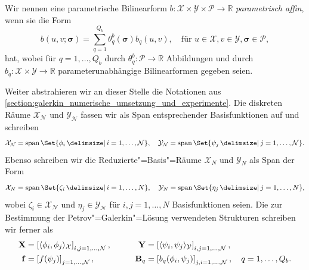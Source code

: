 \documentclass[../main.tex]{subfiles}
\begin{document}
\begin{Definition}
\label{definition:parametrisch_affine_bf_fuer_rbm}
    Wir nennen eine parametrische Bilinearform $b \colon \mathcal X \times \mathcal Y \times \mathcal P \to \mathbb{R}$ \emph{parametrisch affin}, wenn sie die Form
    \begin{equation}
        b(u, v; \bm \sigma) = \sum_{q = 1}^{Q_{b}} \theta_{q}^{b}(\bm \sigma) b_{q}(u, v), \quad \text{für } u \in \mathcal X, v \in \mathcal Y, \bm \sigma \in \mathcal P,
    \end{equation}
    hat, wobei für $q = 1, \dots, Q_{b}$ durch $\theta_{q}^{b} \colon \mathcal P \to \mathbb{R}$ Abbildungen und durch $b_{q} \colon \mathcal X \times \mathcal Y \to \mathbb{R}$ parameterunabhängige Bilinearformen gegeben seien.
\end{Definition}

Weiter abstrahieren wir an dieser Stelle die Notationen aus \cref{section:galerkin_numerische_umsetzung_und_experimente}.
Die diskreten Räume $\mathcal X_{\mathcal N}$ und $\mathcal Y_{\mathcal N}$ fassen wir als Span entsprechender Basisfunktionen auf und schreiben
\begin{equation}
    \mathcal X_{\mathcal N} = \spn \Set{ \phi_{i} \given i = 1, \dots, \mathcal N },
    \quad
    \mathcal Y_{\mathcal N} = \spn \Set{ \psi_{j} \given j = 1, \dots, \mathcal N }.
\end{equation}
Ebenso schreiben wir die Reduzierte"=Basis"=Räume $\mathcal X_{N}$ und $\mathcal Y_{N}$ als Span der Form
\begin{equation}
    \mathcal X_{N} = \spn \Set{ \zeta_{i} \given i = 1, \dots, N},
    \quad
    \mathcal Y_{N} = \spn \Set{ \eta_{j} \given j = 1, \dots, N},
\end{equation}
wobei $\zeta_{i} \in \mathcal X_{\mathcal N}$ und $\eta_{j} \in \mathcal Y_{\mathcal N}$ für $i, j = 1, \dots, N$ Basisfunktionen seien.
Die zur Bestimmung der Petrov"=Galerkin"=Lösung verwendeten Strukturen schreiben wir ferner als
\begin{equation}
    \begin{aligned}
        \mathbf{X} &= \left[ \langle\phi_{i},\phi_{j}\rangle_{\mathcal X} \right]_{i,j = 1, \dots, \mathcal N},
        &\qquad
        \mathbf{Y} &= \left[ \langle\psi_{i},\psi_{j}\rangle_{\mathcal Y} \right]_{i,j = 1, \dots, \mathcal N},
        \\
        \mathbf{f} &= \left[ f(\psi_{j}) \right]_{j = 1, \dots, \mathcal N},
        &\qquad
        \mathbf{B}_{q} &= \left[ b_{q}(\phi_{i}, \psi_{j}) \right]_{j,i = 1, \dots, \mathcal N}, \quad q = 1, \dots, Q_{b}.
    \end{aligned}
\end{equation}
\end{document}
